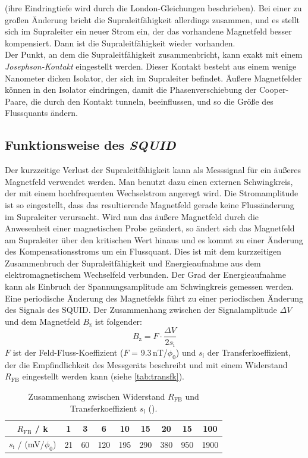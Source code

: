 (ihre Eindringtiefe wird durch die London-Gleichungen beschrieben).
Bei einer zu großen Änderung bricht die Supraleitfähigkeit allerdings zusammen,
und es stellt sich im Supraleiter ein neuer Strom ein, der das vorhandene Magnetfeld besser kompensiert.
Dann ist die Supraleitfähigkeit wieder vorhanden.\\
Der Punkt, an dem die Supraleitfähigkeit zusammenbricht, kann exakt mit einem \emph{Jo\-seph\-son-Kontakt}
eingestellt werden. Dieser Kontakt besteht aus einem wenige Nanometer dicken Isolator,
der sich im Supraleiter befindet.
Äußere Magnetfelder können in den Isolator eindringen, damit die Phasenverschiebung der Cooper-Paare,
die durch den Kontakt tunneln, beeinflussen, und so die Größe des Flussquants ändern.


\subsection{Funktionsweise des \emph{SQUID}}
Der kurzzeitige Verlust der Supraleitfähigkeit kann als Messsignal für ein äußeres Magnetfeld verwendet werden.
Man benutzt dazu einen externen Schwingkreis, der mit einem hochfrequenten Wechselstrom angeregt wird.
Die Stromamplitude ist so eingestellt, dass das resultierende Magnetfeld gerade keine Flussänderung
im Supraleiter verursacht. Wird nun das äußere Magnetfeld durch die Anwesenheit einer magnetischen Probe geändert,
so ändert sich das Magnetfeld am Supraleiter über den kritischen Wert hinaus und es kommt zu einer Änderung
des Kompensationsstroms um ein Flussquant. Dies ist mit dem kurzzeitigen
Zusammenbruch der Supraleitfähigkeit und Energieaufnahme aus dem elektromagnetischem Wechselfeld verbunden.
Der Grad der Energieaufnahme kann als Einbruch der Spannungsamplitude am Schwingkreis
gemessen werden.\\
Eine periodische Änderung des Magnetfelds führt zu einer periodischen Änderung des Signals des SQUID.
Der Zusammenhang zwischen der Signalamplitude $\Delta V$ und dem Magnetfeld $B_\text{z}$ ist folgender:
\begin{equation}
\label{eq:AtoB}
B_\text{z} = F \cdot \frac{\Delta V}{2 s_\text{i}}
\end{equation}
$F$ ist der Feld-Fluss-Koeffizient ($F$ = 9.3\,nT/$\phi_0$) und $s_\text{i}$ der Transferkoeffizient,
der die Empfindlichkeit des Messgeräts beschreibt und mit einem Widerstand $R_{\text{FB}}$ eingestellt
werden kann (siehe \autoref{tab:transfk}).
\begin{table}[H]
\caption{Zusammenhang zwischen Widerstand $R_{\text{FB}}$ und Transferkoeffizient $s_\text{i}$ (\cite{userman}).}
\begin{center}
\begin{tabular}{|c|c|c|c|c|c|c|c|c|}
\hline
$R_{\text{FB}}$ / k\text{\textOmega}	&	1	&	3	&	6	&	10	&	15	&	20	&	15	&	100	\\ \hline
$s_\text{i}$ / (mV/$\phi_0$)		&	21	&	60	&	120	&	195	&	290	&	380	&	950	&	1900	\\ \hline
\end{tabular}
\end{center}
\label{tab:transfk}
\end{table}

